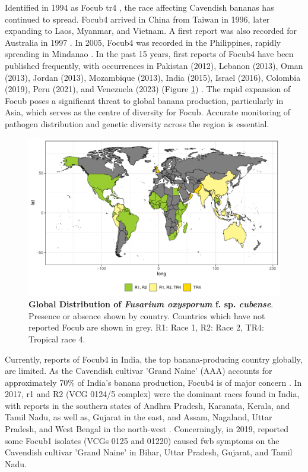 Identified in 1994 as \ac{Focub} \acf{tr4} \parencite{Ploetz1994}, the race affecting Cavendish bananas has continued to spread. \Ac{Focub4} arrived in China from Taiwan in 1996, later expanding to Laos, Myanmar, and Vietnam. A first report was also recorded for Australia in 1997 \parencite{Ploetz2015a}. In 2005, \ac{Focub4} was recorded in the Philippines, rapidly spreading in Mindanao \parencite{Molina2009}. In the past 15 years, first reports of \ac{Focub4} have been published frequently, with occurrences in Pakistan (2012), Lebanon (2013), Oman (2013), Jordan (2013), Mozambique (2013), India (2015), Israel (2016), Colombia (2019), Peru (2021), and Venezuela (2023) (Figure \ref{fig:FocDis}) \parencite{Butler2013, Ploetz2015a, Ordonez2015b, Zheng2018, Thangavelu2019, Garcia-Bastida2020, Maymon2020, Kema2021, Acuna2022,  Herrera2023}.  The rapid expansion of \ac{Focub} poses a significant threat to global banana production, particularly in Asia, which serves as the centre of diversity for \ac{Focub}. Accurate monitoring of pathogen distribution and genetic diversity across the region is essential.  

\begin{figure}[h!]
  \includegraphics[width=14.5cm]{Figures/FocDis.pdf}
  \caption[Global Distribution of \textit{Fusarium oxysporum} f. sp. \textit{cubense}]{\textbf{Global Distribution of \textit{Fusarium oxysporum} f. sp. \textit{cubense}}. Presence or absence shown by country. Countries which have not reported \ac{Focub} are shown in grey. R1: Race 1, R2: Race 2, TR4: Tropical race 4.}
  \label{fig:FocDis}
\end{figure}

\vbox{
Currently, reports of \ac{Focub4} in India, the top banana-producing country globally, are limited. As the Cavendish cultivar 'Grand Naine' (AAA) accounts for approximately 70\% of India's banana production, \ac{Focub4} is of major concern \parencite{Damodaran2019}.  In 2017, \ac{r1} and R2 (VCG 0124/5 complex) were the dominant races found in India, with reports in the southern states of Andhra Pradesh, Karanata, Kerala, and Tamil Nadu, as well as, Gujarat in the east, and Assam, Nagaland, Uttar Pradesh, and West Bengal in the north-west \parencite{Mostert2017, Thangavelu2020}. Concerningly, in 2019, \textcite{Thangavelu2020} reported some \ac{Focub1} isolates (VCGs 0125 and 01220) caused \ac{fwb} symptoms on the Cavendish cultivar 'Grand Naine' in Bihar, Uttar Pradesh, Gujarat, and Tamil Nadu. }

